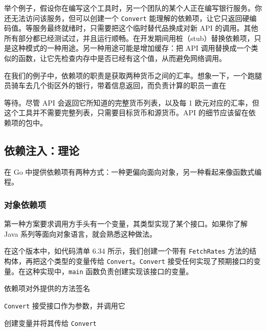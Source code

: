 举个例子，假设你在编写这个工具时，另一个团队的某个人正在编写银行服务。你还无法访问该服务，但可以创建一个 \texttt{Convert} 能理解的依赖项，让它只返回硬编码值。等服务最终就绪时，只需要把这个临时替代品换成对新 API 的调用。其他所有部分都已经测试过，并且运行顺畅。在开发期间用桩（stub）替换依赖项，只是这种模式的一种用途。另一种用途可能是增加缓存：把 API 调用替换成一个类似的函数，让它先检查内存中是否已经有这个值，从而避免网络调用。

在我们的例子中，依赖项的职责是获取两种货币之间的汇率。想象一下，一个跑腿员骑车去几个街区外的银行，带着信息返回，而负责计算的职员一直在

等待。尽管 API 会返回它所知道的完整货币列表，以及每 1 欧元对应的汇率，但这个工具并不需要完整列表，只需要目标货币和源货币。API 的细节应该留在依赖项的包中。

\subsection{依赖注入：理论}

在 Go 中提供依赖项有两种方式：一种更偏向面向对象，另一种看起来像函数式编程。

\subsubsection*{对象依赖项}

第一种方案要求调用方手头有一个变量，其类型实现了某个接口。如果你了解 Java 系列等面向对象语言，就会熟悉这种做法。

在这个版本中，如代码清单 6.34 所示，我们创建一个带有 \texttt{FetchRates} 方法的结构体，再把这个类型的变量传给 \texttt{Convert}。\texttt{Convert} 接受任何实现了预期接口的变量。在这种实现中，\texttt{main} 函数负责创建实现该接口的变量。


\begin{codeannotations}
\item 依赖项对外提供的方法签名
\item \texttt{Convert} 接受接口作为参数，并调用它
\item 创建变量并将其传给 \texttt{Convert}
\end{codeannotations}


